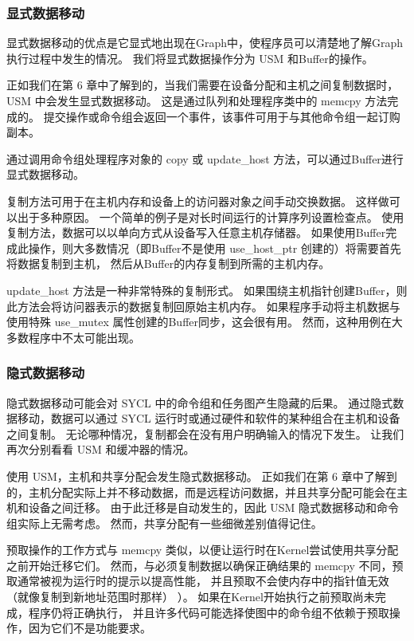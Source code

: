 \subsubsection{显式数据移动}
显式数据移动的优点是它显式地出现在Graph中，使程序员可以清楚地了解Graph执行过程中发生的情况。 
我们将显式数据操作分为 USM 和Buffer的操作。

正如我们在第 6 章中了解到的，当我们需要在设备分配和主机之间复制数据时，USM 中会发生显式数据移动。 
这是通过队列和处理程序类中的 memcpy 方法完成的。 
提交操作或命令组会返回一个事件，该事件可用于与其他命令组一起订购副本。

通过调用命令组处理程序对象的 copy 或 update\_host 方法，可以通过Buffer进行显式数据移动。

复制方法可用于在主机内存和设备上的访问器对象之间手动交换数据。 这样做可以出于多种原因。 
一个简单的例子是对长时间运行的计算序列设置检查点。 使用复制方法，数据可以以单向方式从设备写入任意主机存储器。 
如果使用Buffer完成此操作，则大多数情况（即Buffer不是使用 use\_host\_ptr 创建的）将需要首先将数据复制到主机，
然后从Buffer的内存复制到所需的主机内存。

update\_host 方法是一种非常特殊的复制形式。 
如果围绕主机指针创建Buffer，则此方法会将访问器表示的数据复制回原始主机内存。 
如果程序手动将主机数据与使用特殊 use\_mutex 属性创建的Buffer同步，这会很有用。 
然而，这种用例在大多数程序中不太可能出现。

\subsubsection{隐式数据移动}
隐式数据移动可能会对 SYCL 中的命令组和任务图产生隐藏的后果。 
通过隐式数据移动，数据可以通过 SYCL 运行时或通过硬件和软件的某种组合在主机和设备之间复制。 
无论哪种情况，复制都会在没有用户明确输入的情况下发生。 让我们再次分别看看 USM 和缓冲器的情况。

使用 USM，主机和共享分配会发生隐式数据移动。 
正如我们在第 6 章中了解到的，主机分配实际上并不移动数据，而是远程访问数据，并且共享分配可能会在主机和设备之间迁移。 
由于此迁移是自动发生的，因此 USM 隐式数据移动和命令组实际上无需考虑。 
然而，共享分配有一些细微差别值得记住。

预取操作的工作方式与 memcpy 类似，以便让运行时在Kernel尝试使用共享分配之前开始迁移它们。 
然而，与必须复制数据以确保正确结果的 memcpy 不同，预取通常被视为运行时的提示以提高性能，
并且预取不会使内存中的指针值无效（就像复制到新地址范围时那样） ）。 
如果在Kernel开始执行之前预取尚未完成，程序仍将正确执行，
并且许多代码可能选择使图中的命令组不依赖于预取操作，因为它们不是功能要求。

